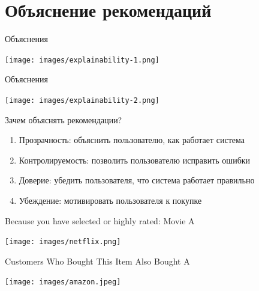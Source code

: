 \documentclass[11pt,aspectratio=169,handout]{beamer}
\begin{document}
\section{Объяснение рекомендаций}

\begin{frame}{Объяснения}

\begin{center}
\texttt{[image: images/explainability-1.png]}
\end{center}

\end{frame}

\begin{frame}{Объяснения}

\begin{center}
\texttt{[image: images/explainability-2.png]}
\end{center}

\end{frame}

\begin{frame}{Зачем объяснять рекомендации?}

\begin{enumerate}[<+->]
\item Прозрачность: объяснить пользователю, как работает система
\item Контролируемость: позволить пользователю исправить ошибки
\item Доверие: убедить пользователя, что система работает правильно
\item Убеждение: мотивировать пользователя к покупке
\end{enumerate}

\end{frame}

\begin{frame}

\begin{tcolorbox}[colback=info!5,colframe=info!80,title=Case-based]
Because you have selected or highly rated: Movie A
\end{tcolorbox}

\vfill

\begin{center}
\texttt{[image: images/netflix.png]}
\end{center}

\end{frame}

\begin{frame}

\begin{tcolorbox}[colback=info!5,colframe=info!80,title=Collaborative]
Customers Who Bought This Item Also Bought A
\end{tcolorbox}

\vfill

\begin{center}
\texttt{[image: images/amazon.jpeg]}
\end{center}

\end{frame}
\end{document}
